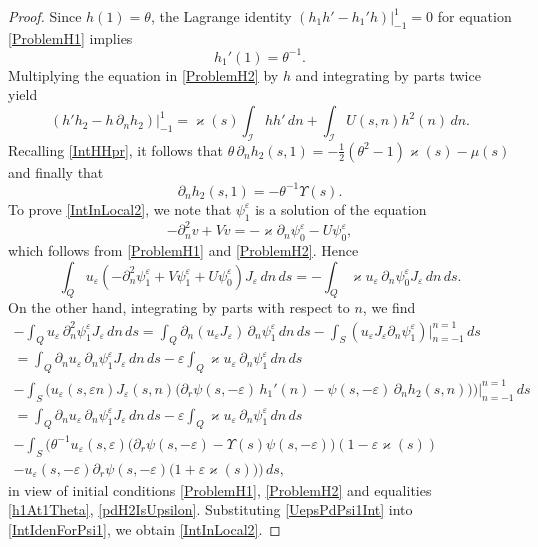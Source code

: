 \documentclass[reqno]{amsart}
\theoremstyle{plain}
\numberwithin{equation}{section}
\renewcommand{\kappa}{\varkappa}
\newcommand{\eps}{\varepsilon}
\newcommand{\cI}{\mathcal{I}}
\begin{document}
\begin{proof}
Since $h(1)=\theta$, the Lagrange identity $(h_1h'-h_1'h)|_{-1}^1=0$ for equation  \eqref{ProblemH1} implies
\begin{equation}\label{h1At1Theta}
  h_1'(1)=\theta^{-1}.
\end{equation}
Multiplying the equation in \eqref{ProblemH2} by $h$ and  integrating by parts twice yield
\begin{equation*}
 (h'h_2-h\,\partial_n h_2)\big|_{-1}^1=\kappa(s)\int_{\cI}hh'\,dn
  +\int_{\cI}U(s,n)h^2(n)\, dn.
\end{equation*}
Recalling \eqref{IntHHpr}, it follows that $\theta \,\partial_n h_2(s,1)=-\tfrac{1}{2}(\theta^2-1)\kappa(s)-\mu(s)$ and finally that
\begin{equation}\label{pdH2IsUpsilon}
\partial_n h_2(s,1)=-\theta^{-1}\Upsilon(s).
\end{equation}
To prove \eqref{IntInLocal2}, we note that $\psi_1^\eps$ is a solution of the equation
\begin{equation*}
-\partial_n^2v+Vv=-\kappa \partial_n \psi_0^\eps-U\psi_0^\eps,
\end{equation*}
which follows from \eqref{ProblemH1} and \eqref{ProblemH2}. Hence
\begin{equation}\label{IntIdenForPsi1}
  \int_Qu_\eps (-\partial_n^2 \psi_1^\eps+V \psi_1^\eps+U \psi_0^\eps)J_\eps\,dn\,ds=-\int_Q \kappa u_\eps\, \partial_n\psi_0^\eps J_\eps\,dn\,ds.
\end{equation}
On the other hand,  integrating by parts with respect to $n$,  we find
\begin{multline}\label{UepsPdPsi1Int}
  -\int_Q u_\eps \,\partial_n^2 \psi_1^\eps J_\eps\,dn\,ds=
  \int_Q \partial_n (u_\eps J_\eps) \,\partial_n \psi_1^\eps\,dn\,ds
  -\int_S(u_\eps J_\eps\partial_n \psi_1^\eps)\big|_{n=-1}^{n=1}\,ds
  \\=
  \int_Q \partial_n u_\eps  \,\partial_n \psi_1^\eps J_\eps\,dn\,ds-
  \eps\int_Q \kappa u_\eps \,\partial_n \psi_1^\eps\,dn\,ds
  \\-
  \int_S\Big(u_\eps(s,\eps n) J_\eps(s,n)\big(\partial_r\psi(s,-\eps)\,h_1'(n)
     -\psi(s,-\eps)\,\partial_n h_2(s,n)\big) \Big)\Big|_{n=-1}^{n=1}\,ds
  \\=
  \int_Q \partial_n u_\eps  \,\partial_n \psi_1^\eps J_\eps\,dn\,ds-
  \eps\int_Q \kappa u_\eps \,\partial_n \psi_1^\eps\,dn\,ds
  \\-
  \int_S \bigg(\theta^{-1}u_\eps(s,\eps)\big(\partial_r\psi(s,-\eps)
    -\Upsilon(s)\psi(s,-\eps)\big)(1-\eps \kappa(s))
    \\
    -u_\eps(s,-\eps)\partial_r \psi(s,-\eps)\big(1+\eps \kappa(s)\big)
\Big)\,ds,
\end{multline}
in view of initial conditions \eqref{ProblemH1}, \eqref{ProblemH2} and equalities \eqref{h1At1Theta},  \eqref{pdH2IsUpsilon}. Substituting
\eqref{UepsPdPsi1Int} into \eqref{IntIdenForPsi1}, we obtain \eqref{IntInLocal2}.
\end{proof}
\end{document}

